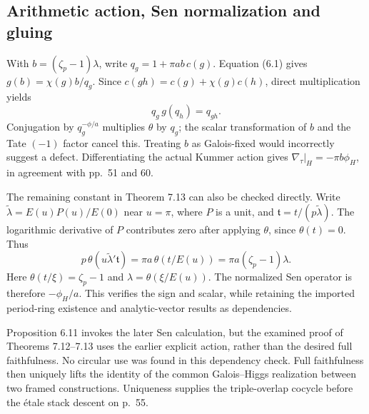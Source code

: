 \documentclass[10pt]{article}
\begin{document}
\subsection*{Arithmetic action, Sen normalization and gluing}
With \(b=(\zeta_p-1)\lambda\), write \(q_g=1+\pi ab\,c(g)\). Equation (6.1) gives \(g(b)=\chi(g)b/q_g\). Since \(c(gh)=c(g)+\chi(g)c(h)\), direct multiplication yields \[q_g\,g(q_h)=q_{gh}.                              \tag{3.3}\] Conjugation by \(q_g^{-\phi/a}\) multiplies \(\theta\) by \(q_g\); the scalar transformation of \(b\) and the Tate \((-1)\) factor cancel this. Treating \(b\) as Galois-fixed would incorrectly suggest a defect. Differentiating the actual Kummer action gives \(\nabla_\tau|_H=-\pi b\phi_H\), in agreement with pp. 51 and 60.\par
The remaining constant in Theorem 7.13 can also be checked directly. Write \(\widetilde\lambda=E(u)P(u)/E(0)\) near \(u=\pi\), where \(P\) is a unit, and \(\mathfrak t=t/(p\widetilde\lambda)\). The logarithmic derivative of \(P\) contributes zero after applying \(\theta\), since \(\theta(t)=0\). Thus \[p\,\theta(u\widetilde\lambda'\mathfrak t)
 =\pi a\,\theta(t/E(u))
 =\pi a(\zeta_p-1)\lambda.                        \tag{3.4}\] Here \(\theta(t/\xi)=\zeta_p-1\) and \(\lambda=\theta(\xi/E(u))\). The normalized Sen operator is therefore \(-\phi_H/a\). This verifies the sign and scalar, while retaining the imported period-ring existence and analytic-vector results as dependencies.\par
Proposition 6.11 invokes the later Sen calculation, but the examined proof of Theorems 7.12–7.13 uses the earlier explicit action, rather than the desired full faithfulness. No circular use was found in this dependency check. Full faithfulness then uniquely lifts the identity of the common Galois–Higgs realization between two framed constructions. Uniqueness supplies the triple-overlap cocycle before the étale stack descent on p. 55.\par
\end{document}
